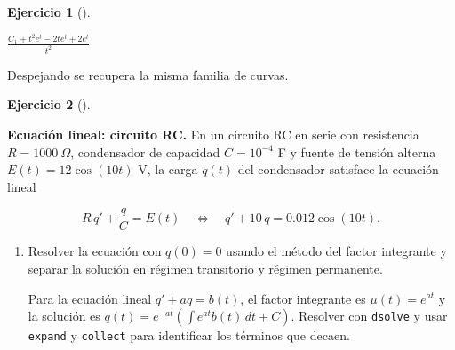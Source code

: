 \documentclass[
  spanish,
  a4paper,
]{scrreport}
\theoremstyle{definition}
\newtheorem{exercise}{Ejercicio}[chapter]
\theoremstyle{remark}
\begin{document}
\begin{exercise}[]
\begin{tcolorbox}
$\frac{C_{1} + t^{2} e^{t} - 2 t e^{t} + 2 e^{t}}{t^{2}}$

Despejando se recupera la misma familia de curvas.

\end{tcolorbox}

\end{exercise}

\begin{exercise}[]\protect\hypertarget{exr-lineal-circuito}{}\label{exr-lineal-circuito}

\textbf{Ecuación lineal: circuito RC.} En un circuito RC en serie con
resistencia \(R = 1000\ \Omega\), condensador de capacidad \(C=10^{-4}\)
F y fuente de tensión alterna \(E(t) = 12\cos(10 t)\) V, la carga
\(q(t)\) del condensador satisface la ecuación lineal

\[
R\,q' + \frac{q}{C} = E(t)
\quad\Longleftrightarrow\quad
q' + 10\,q = 0.012\cos(10 t).
\]

\begin{enumerate}
\def\labelenumi{\alph{enumi}.}
\item
  Resolver la ecuación con \(q(0)=0\) usando el método del factor
  integrante y separar la solución en régimen transitorio y régimen
  permanente.

  \begin{tcolorbox}[enhanced jigsaw, arc=.35mm, bottomrule=.15mm, bottomtitle=1mm, breakable, colback=white, colbacktitle=quarto-callout-note-color!10!white, colframe=quarto-callout-note-color-frame, coltitle=black, left=2mm, leftrule=.75mm, opacityback=0, opacitybacktitle=0.6, rightrule=.15mm, title=\textcolor{quarto-callout-note-color}{\faInfo}\hspace{0.5em}{Ayuda}, titlerule=0mm, toprule=.15mm, toptitle=1mm]

  Para la ecuación lineal \(q' + a q = b(t)\), el factor integrante es
  \(\mu(t)=e^{at}\) y la solución es
  \(q(t)=e^{-at}\left(\int e^{at} b(t)\,dt + C\right)\). Resolver con
  \texttt{dsolve} y usar \texttt{expand} y \texttt{collect} para
  identificar los términos que decaen.

  \end{tcolorbox}

  \begin{tcolorbox}[enhanced jigsaw, arc=.35mm, bottomrule=.15mm, bottomtitle=1mm, breakable, colback=white, colbacktitle=quarto-callout-tip-color!10!white, colframe=quarto-callout-tip-color-frame, coltitle=black, left=2mm, leftrule=.75mm, opacityback=0, opacitybacktitle=0.6, rightrule=.15mm, title=\textcolor{quarto-callout-tip-color}{\faLightbulb}\hspace{0.5em}{Solución}, titlerule=0mm, toprule=.15mm, toptitle=1mm]


\end{tcolorbox}
\end{enumerate}
\end{exercise}
\end{document}

